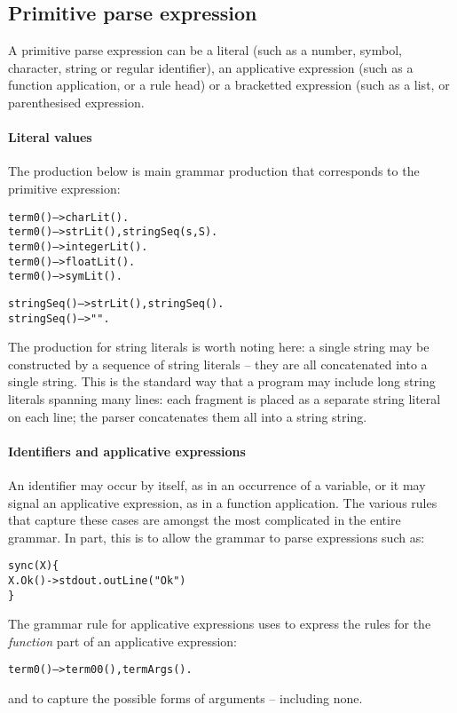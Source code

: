 
     
\subsection{Primitive parse expression}
\label{grammar:primitive}
A primitive parse expression can be a literal (such as a number, symbol, character, string or regular identifier), an applicative expression (such as a function application, or a rule head) or a bracketted expression (such as a list, or parenthesised expression.

\paragraph{Literal values}
The  production below is main grammar production that corresponds to the primitive expression:

\begin{alltt}
term0() --> charLit().
term0() --> strLit(), stringSeq(s,S).
term0() --> integerLit().
term0() --> floatLit().
term0() --> symLit().

stringSeq() --> strLit(), stringSeq().
stringSeq() --> "".
\end{alltt}
The production for string literals is worth noting here: a single string may be constructed by a sequence of string literals -- they are all concatenated into a single string. This is the standard way that a \go program may include long string literals spanning many lines: each fragment is placed as a separate string literal on each line; the parser concatenates them all into a string string.
     
\paragraph{Identifiers and applicative expressions}
An identifier may occur by itself, as in an occurrence of a variable, or it may signal an applicative expression, as in a function application. The various rules that capture these cases are amongst the most complicated in the entire \go grammar. In part, this is to allow the grammar to parse expressions such as:
\begin{alltt}
sync(X)\{
  X.Ok() -> stdout.outLine("Ok")
\}
\end{alltt}
The grammar rule for applicative expressions uses  to express the rules for the \emph{function} part of an applicative expression:
\begin{alltt}
term0() --> term00(), termArgs().
\end{alltt}
and  to capture the possible forms of arguments -- including none.

